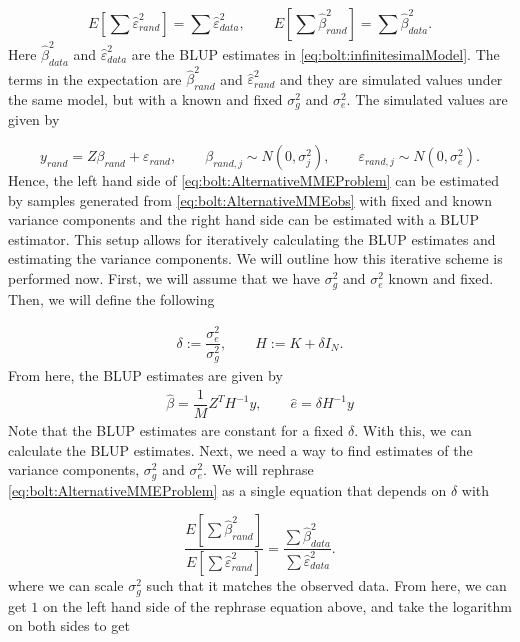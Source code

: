 \begin{equation} \label{eq:bolt:AlternativeMMEProblem}
E\left[ \sum \hat{\varepsilon}^2_{rand} \right] = \sum \hat{\varepsilon}^2_{data}, \qquad E\left[ \sum \hat{\beta}^2_{rand} \right] = 
\sum \hat{\beta}^2_{data}.
\end{equation}
Here $ \hat{\beta}^2_{data} $ and $ \hat{\varepsilon}^2_{data} $ are the BLUP estimates in \cref{eq:bolt:infinitesimalModel}. The 
terms in the expectation are $ \hat{\beta}^2_{rand} $ and $ \hat{\varepsilon}^2_{rand} $ and they are simulated values under the same model, but with a known and fixed $ \sigma_g^2 $ and $ \sigma_e^2 $. The simulated values are given by

\begin{equation} \label{eq:bolt:AlternativeMMEobs}
y_{rand} = Z \beta_{rand} + \varepsilon_{rand}, \qquad \beta_{rand,j} \sim N(0, \sigma_j^2),  \qquad \varepsilon_{rand,j} \sim N(0, 
\sigma_e^2).
\end{equation} 
Hence, the left hand side of \cref{eq:bolt:AlternativeMMEProblem} can be estimated by samples generated from 
\cref{eq:bolt:AlternativeMMEobs} with fixed and known variance components and the right hand side can be estimated with a BLUP estimator. This setup allows for iteratively calculating the BLUP estimates and estimating the variance components. We will outline how this iterative scheme is performed now. First, we will assume that we have $ \sigma_g^2 $ and $ \sigma_e^2 $ known and fixed. Then, we will define the following 

\begin{align}
	\delta := \dfrac{\sigma_e^2}{\sigma_g^2}, \qquad H := K + \delta I_N.
\end{align}
From here, the BLUP estimates are given by
\begin{align} \label{eq:bolt:iterativeBLUP}
	\hat{\beta} = \dfrac{1}{M}Z^T H^{-1} y,  \qquad  \hat{e} = \delta H^{-1}y
\end{align}
Note that the BLUP estimates are constant for a fixed $ \delta $. With this, we can calculate the BLUP estimates. Next, we need a way to find estimates of the variance components, $ \sigma_g^2 $ and $ \sigma_e^2 $. We will rephrase \cref{eq:bolt:AlternativeMMEProblem} as a single equation that depends on $ \delta $ with 

\begin{equation}
\dfrac
{E\left[ \sum \hat{\beta}^2_{rand} \right]}
{E\left[ \sum \hat{\varepsilon}^2_{rand} \right]}
 =
\dfrac
{\sum \hat{\beta}^2_{data}}
{\sum \hat{\varepsilon}^2_{data}}.
\end{equation}
where we can scale $ \sigma_g^2 $ such that it matches the observed data. From here, we can get $ 1 $ on the left hand side of the rephrase equation above, and take the logarithm on both sides to get

